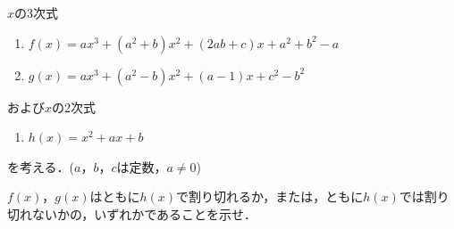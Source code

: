 \documentclass[../../main.tex]{subfiles}
\begin{document}
$x$の3次式
\begin{enumerate}
  \item []$f(x)=ax^3+(a^2+b)x^2+(2ab+c)x+a^2+b^2-a$
  \item []$g(x)=ax^3+(a^2-b)x^2+(a-1)x+c^2-b^2$
\end{enumerate}
および$x$の2次式
\begin{enumerate}
  \item []$h(x)=x^2+ax+b$
\end{enumerate}
を考える．($a$，$b$，$c$は定数，$a\neq0$)

$f(x)$，$g(x)$はともに$h(x)$で割り切れるか，または，ともに$h(x)$では割り切れないかの，いずれかであることを示せ．
\end{document}
